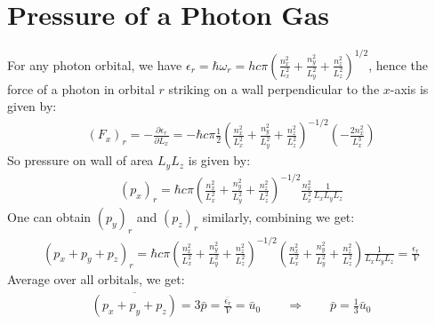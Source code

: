 \documentclass[11pt,oneside]{book}
\theoremstyle{break}
\theoremstyle{break}
\begin{document}
\newpage
\section[Pressure of a Photon Gas]{\color{red}Pressure of a Photon Gas\color{black}}
For any photon orbital, we have $\epsilon_r = \hbar \omega_r = hc\pi \left( \frac{n_x^2}{L_x^2} + \frac{n_y^2}{L_y^2} + \frac{n_z^2}{L_z^2}\right)^{1/2}$, hence the force of a photon in orbital $r$ striking on a wall perpendicular to the $x$-axis is given by:
\begin{align*}
(F_x)_r = -\frac{\partial \epsilon_r}{\partial L_x} = -\hbar c\pi \frac{1}{2}\left( \frac{n_x^2}{L_x^2} + \frac{n_y^2}{L_y^2} + \frac{n_z^2}{L_z^2} \right)^{-1/2} \left( -\frac{2n_x^2}{L_x^3}\right)
\end{align*}
So pressure on wall of area $L_yL_z$ is given by:
\begin{align*}
\left( p_x\right)_r = \hbar c\pi \left(  \frac{n_x^2}{L_x^2} + \frac{n_y^2}{L_y^2} + \frac{n_z^2}{L_z^2}\right)^{-1/2} \frac{n_x^2}{L_x^2}\frac{1}{L_xL_yL_z}
\end{align*}
One can obtain $( p_y)_r$ and $(p_z)_r$ similarly, combining we get:
\begin{align*}
(p_x+p_y+p_z)_r = \hbar c\pi \left( \frac{n_x^2}{L_x^2} + \frac{n_y^2}{L_y^2} + \frac{n_z^2}{L_z^2} \right)^{-1/2}\left(  \frac{n_x^2}{L_x^2} + \frac{n_y^2}{L_y^2} + \frac{n_z^2}{L_z^2}\right) \frac{1}{L_xL_yL_z} = \frac{\epsilon_r}{V}
\end{align*}
Average over all orbitals, we get:
\begin{align*}
\overline{(p_x+p_y+p_z)} = 3\bar{p} = \frac{\overline{\epsilon_r}}{V} = \bar{u}_0 \qquad \Rightarrow \qquad \bar{p} = \frac{1}{3}\bar{u}_0
\end{align*}
\end{document}
